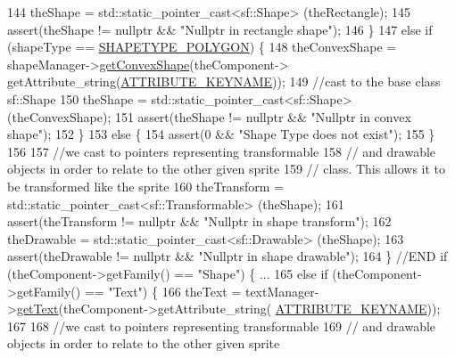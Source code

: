 \begin{DoxyCode}
144                     theShape = std::static\_pointer\_cast<sf::Shape> (theRectangle);
145                     assert(theShape != \textcolor{keyword}{nullptr} && \textcolor{stringliteral}{"Nullptr in rectangle shape"});
146                 \}
147                 \textcolor{keywordflow}{else} \textcolor{keywordflow}{if} (shapeType == \hyperlink{_a_e___attributes_8h_a8cdd66786d6e0ac4a43efc26533ff4e1}{SHAPETYPE\_POLYGON}) \{
148                     theConvexShape = shapeManager->\hyperlink{class_shape_manager_a0a07b7e7690736e972a17c31cf6ea7af}{getConvexShape}(theComponent->
      getAttribute\_string(\hyperlink{_a_e___attributes_8h_a38d48cad306c55d90faa362aa5023de8}{ATTRIBUTE\_KEYNAME}));
149                     \textcolor{comment}{//cast to the base class sf::Shape}
150                     theShape = std::static\_pointer\_cast<sf::Shape> (theConvexShape);
151                     assert(theShape != \textcolor{keyword}{nullptr} && \textcolor{stringliteral}{"Nullptr in convex shape"});
152                 \}
153                 \textcolor{keywordflow}{else} \{
154                     assert(0 && \textcolor{stringliteral}{"Shape Type does not exist"});
155                 \}
156 
157                 \textcolor{comment}{//we cast to pointers representing transformable}
158                 \textcolor{comment}{//  and drawable objects in order to relate to the other given sprite}
159                 \textcolor{comment}{//  class. This allows it to be transformed like the sprite}
160                 theTransform = std::static\_pointer\_cast<sf::Transformable> (theShape);
161                 assert(theTransform != \textcolor{keyword}{nullptr} && \textcolor{stringliteral}{"Nullptr in shape transform"});
162                 theDrawable = std::static\_pointer\_cast<sf::Drawable> (theShape);
163                 assert(theDrawable != \textcolor{keyword}{nullptr} && \textcolor{stringliteral}{"Nullptr in shape drawable"});
164             \} \textcolor{comment}{//END if (theComponent->getFamily() == "Shape") \{ ...}
165             \textcolor{keywordflow}{else} \textcolor{keywordflow}{if} (theComponent->getFamily() == \textcolor{stringliteral}{"Text"}) \{
166                 theText = textManager->\hyperlink{class_text_manager_abb1b5688839e2da0a14e6c6527438b43}{getText}(theComponent->getAttribute\_string(
      \hyperlink{_a_e___attributes_8h_a38d48cad306c55d90faa362aa5023de8}{ATTRIBUTE\_KEYNAME}));
167 
168                 \textcolor{comment}{//we cast to pointers representing transformable}
169                 \textcolor{comment}{//  and drawable objects in order to relate to the other given sprite}

\end{DoxyCode}
